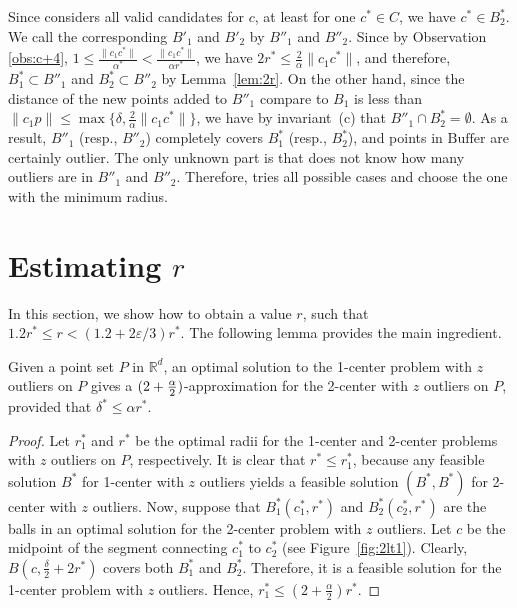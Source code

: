 \documentclass[envcountsame]{cls/cccg15}
\newcommand{\Buffer}{\ensuremath{\text{Buffer}}}
\newcommand{\IR}{\ensuremath{\mathbb{R}}}
\newcommand{\len}[1]{\|{#1}\|}
\newcommand{\radius}[1]{\frac{2}{\alpha} \len{c_1 #1}}
\newcommand{\lee}{\leqslant}
\renewcommand{\leq}{\lee}
\renewcommand{\le}{\lee}
\newcommand{\eps}{\varepsilon}
\begin{document}
Since  considers all valid candidates for $c$, 
at least for one $c^* \in C$, we have $c^* \in B_2^*$. 
We call the corresponding $B'_1$ and $B'_2$ by $B''_1$ and $B''_2$. 
Since by Observation \ref{obs:c+4},
$1 \leq \frac{\len{c_1 c^*}}{\alpha^*} < \frac{\len {c_1 c^*}}{\alpha r^*}$, 
we have $2r^* \leq \radius{c^*}$, and therefore,
$B^*_1 \subset B''_1$ and $B^*_2 \subset B''_2$ by Lemma~\ref{lem:2r}.
On the other hand, since the distance of the new points added to $B''_1$ compare to $B_1$ is less than $\len{c_1 p} \leq \max \{\delta, \radius{c^*} \}$, 
we have by invariant~(c) that  $B''_1 \cap B_2^* = \emptyset$.
As a result, $B''_1$ (resp., $B''_2$) completely covers $B_1^*$  (resp., $B_2^*$), 
and points in $\Buffer$ are certainly outlier.
The only unknown part is that  does not know how many outliers are in $B''_1$ and $B''_2$.
Therefore,  tries all possible cases and choose the one with the minimum radius.





\section{Estimating $r$}
\label{sec:estimate}

In this section, we show how to obtain a value $r$,
such that $1.2r^* \le r < (1.2 + 2\eps/3)r^*$.
The following lemma provides the main ingredient.

\begin{lemma}
\label{lem:2-approx}
	Given a point set $P$ in $\IR^d$,
	an optimal solution to the 1-center problem with $z$ outliers on $P$
	gives a $(2 + {\alpha \over 2})$-approximation for
	the 2-center with $z$ outliers on $P$,
	provided that $\delta^* \le \alpha r^*$.
\end{lemma}


\begin{proof}
Let $r_1^*$ and $r^*$ be the optimal radii for
the 1-center and 2-center problems with $z$ outliers on $P$, respectively.
It is clear that $r^* \le r_1^*$,
because any feasible solution $B^*$ for 1-center with $z$ outliers
yields a feasible solution $(B^*, B^*)$ for 2-center with $z$ outliers.
Now, suppose that $B_1^*(c_1^*, r^*)$ and $B_2^*(c_2^*, r^*)$
are the balls in an optimal solution for the 2-center problem with $z$ outliers.
Let $c$ be the midpoint of the segment connecting 
$c_1^*$ to $c_2^*$ (see Figure~\ref{fig:2lt1}).
Clearly, $B\left(c, \frac{\delta}{2} + 2r^*\right)$ covers both $B_1^*$ and $B_2^*$. 
Therefore, it is a feasible solution for the 1-center problem with $z$ outliers.
Hence, $ r_1^* \le \left(2 + \frac{\alpha}{2}\right) r^*$.
\end{proof}
\end{document}
